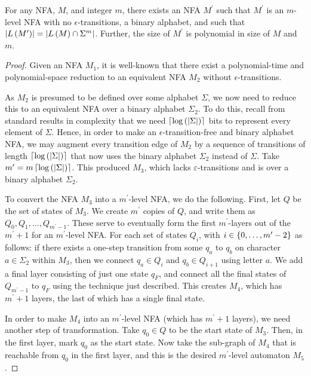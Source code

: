 \begin{lemma}
  For any NFA, \(M\), and integer \(m\),
  there exists an NFA \(M^\prime\) such that \(M^\prime\)
  is an \(m\)-level NFA with no \(\epsilon\)-transitions,
  a binary alphabet, and such that
  \(\left\lvert L\left(M^\prime\right)\right\rvert = \left\lvert L\left(M\right) \cap \Sigma^m\right\rvert\).
  Further, the size of \(M^\prime\) is polynomial in size of \(M\) and \(m\).
\end{lemma}
\begin{proof}
  Given an NFA \(M_1\), it is well-known that there exist
  a polynomial-time and polynomial-space reduction to an equivalent
  NFA \(M_2\) without \(\epsilon\)-transitions.

  As \(M_2\) is presumed to be defined over some alphabet \(\Sigma\),
  we now need to reduce this to an equivalent NFA over a binary alphabet
  \(\Sigma_2\).
  To do this, recall from standard results in complexity that we need
  \(\left\lceil\log\left(\left\lvert\Sigma\right\rvert\right)\right\rceil\) bits to represent every element
  of \(\Sigma\).
  Hence, in order to make an \(\epsilon\)-transition-free and
  binary alphabet NFA,
  we may augment every transition edge of \(M_2\)
  by a sequence of transitions of length
  \(\left\lceil\log\left(\left\lvert\Sigma\right\rvert\right)\right\rceil\) that now uses the binary
  alphabet \(\Sigma_2\) instead of \(\Sigma\).
  Take \(m^\prime = m \left\lceil\log\left(\left\lvert\Sigma\right\rvert\right)\right\rceil\).
  This produced \(M_3\), which lacks \(\varepsilon\)-transitions
  and is over a binary alphabet \(\Sigma_2\).

  To convert the NFA \(M_3\) into a
  \(m^\prime\)-level NFA,
  we do the following.
  First, let \(Q\) be the set of states of \(M_3\).
  We create \(m^\prime\) copies of \(Q\), and write them as
  \(Q_0, Q_1, \ldots, Q_{m^\prime - 1}\).
  These serve to eventually form the first \(m^\prime\)-layers out of the
  \(m^\prime + 1\) for an \(m^\prime\)-level NFA.
  For each set of states \(Q_i\), with
  \(i \in \left\{0, \ldots, m^\prime - 2\right\}\)
  as follows: if there exists a one-step transition from some \(q_a\) to
  \(q_b\) on character \(a \in \Sigma_2\) within \(M_3\),
  then we connect \(q_a \in Q_i\) and \(q_b \in Q_{i + 1}\) using
  letter \(a\).
  We add a final layer consisting of just one state \(q_F\),
  and connect all the final states of \(Q_{m^\prime - 1}\) to
  \(q_F\) using the technique just described.
  This creates \(M_4\), which has \(m^\prime + 1\) layers,
  the last of which has a single final state.

  In order to make \(M_4\) into an \(m^\prime\)-level NFA
  (which has \(m^\prime + 1\) layers),
  we need another step of transformation.
  Take \(q_0 \in Q\) to be the start state of \(M_3\).
  Then, in the first layer, mark \(q_0\) as the start state.
  Now take the sub-graph of \(M_4\) that is reachable from \(q_0\)
  in the first layer,
  and this is the desired \(m^\prime\)-level automaton \(M_5\).


\end{proof}
